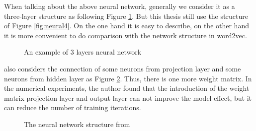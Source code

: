 When talking about the above neural network, generally we consider it as a three-layer structure as following Figure \ref{fig:neural3}. But this thesis still use the structure of Figure \ref{fig:neural4}. On the one hand it is easy to describe, on the other hand it is more convenient to do comparison with the network structure in word2vec.

\begin{figure}[!ht]
  \centering
	\caption{An example of 3 layers neural network}
	\label{fig:neural3}
\end{figure}
\citep{BengioDucharmeEtAl2003} also considers the connection of some neurons from projection layer and some neurons from hidden layer as Figure \ref{fig:bengio}. Thus, there is one more weight matrix. In the numerical experiments, the author found that the introduction of the weight matrix projection layer and output layer can not improve the model effect, but it can reduce the number of training iterations.
\begin{figure}[!ht]
  \centering
	\caption{The neural network structure from \citep{BengioDucharmeEtAl2003}}
	\label{fig:bengio}
\end{figure}

